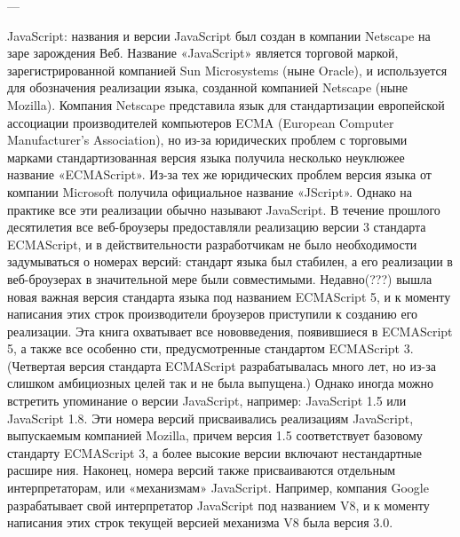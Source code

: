 ---

JavaScript: названия и версии
JavaScript был создан в компании Netscape на заре зарождения Веб. Название «JavaScript» является торговой маркой, зарегистрированной компанией Sun Microsystems (ныне Oracle), и  используется для обозначения реализации языка, созданной компанией Netscape (ныне Mozilla). Компания Netscape представила язык для стандартизации европейской ассоциации производителей компьютеров ECMA (European Computer Manufacturer’s Association), но из-за юридических проблем с торговыми марками стандартизованная версия языка получила несколько неуклюжее название «ECMAScript». Из-за тех же юридических проблем версия языка от компании Microsoft получила официальное название «JScript». Однако на практике все эти реализации обычно называют JavaScript. В течение прошлого десятилетия все веб-броузеры предоставляли реализацию версии 3 стандарта ECMAScript, и в действительности разработчикам не было необходимости задумываться о номерах версий: стандарт языка был стабилен, а его реализации в веб-броузерах в значительной мере были совместимыми. Недавно(???) вышла новая важная версия стандарта языка под названием ECMAScript 5, и к моменту написания этих строк производители броузеров приступили к созданию его реализации. Эта книга охватывает все нововведения, появившиеся в ECMAScript 5, а также все особенно
сти, предусмотренные стандартом ECMAScript 3. (Четвертая версия стандарта ECMAScript разрабатывалась много лет, но из-за слишком амбициозных целей так и не была выпущена.) Однако иногда можно встретить упоминание о версии JavaScript, например: JavaScript 1.5 или JavaScript 1.8. Эти номера версий присваивались реализациям JavaScript, выпускаемым компанией Mozilla, причем версия 1.5 соответствует базовому стандарту ECMAScript 3, а более высокие версии включают нестандартные расшире
ния. Наконец, номера версий также присваиваются отдельным интерпретаторам, или «механизмам» JavaScript. Например, компания Google разрабатывает свой интерпретатор JavaScript под названием V8, и к моменту написания этих строк текущей версией механизма V8 была версия 3.0.\cite{JsDef6}
